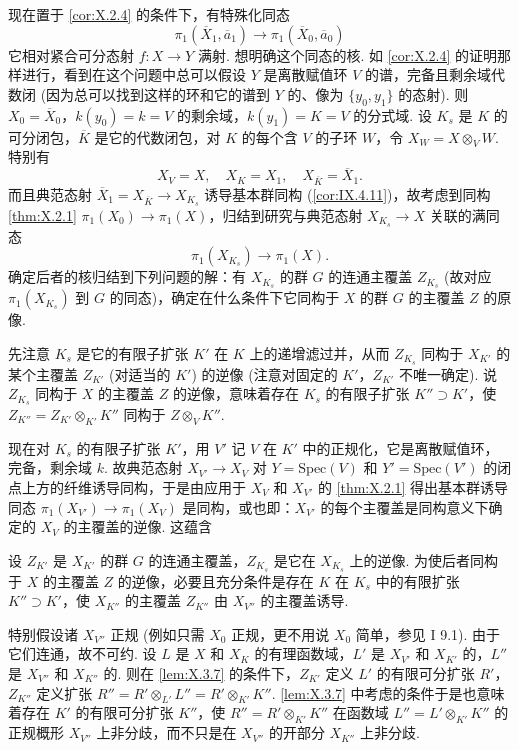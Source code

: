 现在置于 \ref{cor:X.2.4} 的条件下，有特殊化同态
\[
\pi_1(\overline{X}_1, \overline{a}_1) \longrightarrow \pi_1(\overline{X}_0, \overline{a}_0)
\]
它相对紧合可分态射 $f \colon X \to Y$ 满射. 想明确这个同态的核. 如 \ref{cor:X.2.4} 的证明那样进行，看到在这个问题中总可以假设 $Y$ 是离散赋值环 $V$ 的谱，完备且剩余域代数闭 (因为总可以找到这样的环和它的谱到 $Y$ 的、像为 $\{y_0, y_1\}$ 的态射). 则 $X_0 = \overline{X}_0$，$k(y_0) = k = V$ 的剩余域，$k(y_1) = K = V$ 的分式域. 设 $K_s$ 是 $K$ 的可分闭包，$\overline{K}$ 是它的代数闭包，对 $K$ 的每个含 $V$ 的子环 $W$，令 $X_W = X \otimes_V W$. 特别有
\[
X_V = X, \quad X_K = X_1, \quad X_{\overline{K}} = \overline{X}_1.
\]
而且典范态射 $\overline{X}_1 = X_{\overline{K}} \to X_{K_s}$ 诱导基本群同构 (\cref{cor:IX.4.11})，故考虑到同构 \ref{thm:X.2.1} $\pi_1(X_0) \to \pi_1(X)$，归结到研究与典范态射 $X_{K_s} \to X$ 关联的满同态
\[
\pi_1(X_{K_s}) \longrightarrow \pi_1(X).
\]
确定后者的核归结到下列问题的解：有 $X_{K_s}$ 的群 $G$ 的连通主覆盖 $Z_{K_s}$ (故对应 $\pi_1(X_{K_s})$ 到 $G$ 的同态)，确定在什么条件下它同构于 $X$ 的群 $G$ 的主覆盖 $Z$ 的原像.

先注意 $K_s$ 是它的有限子扩张 $K'$ 在 $K$ 上的递增滤过并，从而 $Z_{K_s}$ 同构于 $X_{K'}$ 的某个主覆盖 $Z_{K'}$ (对适当的 $K'$) 的逆像 (注意对固定的 $K'$，$Z_{K'}$ 不唯一确定). 说 $Z_{K_s}$ 同构于 $X$ 的主覆盖 $Z$ 的逆像，意味着存在 $K_s$ 的有限子扩张 $K'' \supset K'$，使 $Z_{K''} = Z_{K'} \otimes_{K'} K''$ 同构于 $Z \otimes_V K''$.

现在对 $K_s$ 的有限子扩张 $K'$，用 $V'$ 记 $V$ 在 $K'$ 中的正规化，它是离散赋值环，完备，剩余域 $k$. 故典范态射 $X_{V'} \to X_V$ 对 $Y = \mathrm{Spec}(V)$ 和 $Y' = \mathrm{Spec}(V')$ 的闭点上方的纤维诱导同构，于是由应用于 $X_V$ 和 $X_{V'}$ 的 \ref{thm:X.2.1} 得出基本群诱导同态 $\pi_1(X_{V'}) \to \pi_1(X_V)$ 是同构，或也即：$X_{V'}$ 的每个主覆盖是同构意义下确定的 $X_V$ 的主覆盖的逆像. 这蕴含

\begin{lemma}\label{lem:X.3.7}
设 $Z_{K'}$ 是 $X_{K'}$ 的群 $G$ 的连通主覆盖，$Z_{K_s}$ 是它在 $X_{K_s}$ 上的逆像. 为使后者同构于 $X$ 的主覆盖 $Z$ 的逆像，必要且充分条件是存在 $K$ 在 $K_s$ 中的有限扩张 $K'' \supset K'$，使 $X_{K''}$ 的主覆盖 $Z_{K''}$ 由 $X_{V''}$ 的主覆盖诱导.
\end{lemma}

特别假设诸 $X_{V''}$ 正规 (例如只需 $X_0$ 正规，更不用说 $X_0$ 简单，参见 I 9.1). 由于它们连通，故不可约. 设 $L$ 是 $X$ 和 $X_K$ 的有理函数域，$L'$ 是 $X_{V'}$ 和 $X_{K'}$ 的，$L''$ 是 $X_{V''}$ 和 $X_{K''}$ 的. 则在 \ref{lem:X.3.7} 的条件下，$Z_{K'}$ 定义 $L'$ 的有限可分扩张 $R'$，$Z_{K''}$ 定义扩张 $R'' = R' \otimes_{L'} L'' = R' \otimes_{K'} K''$. \ref{lem:X.3.7} 中考虑的条件于是也意味着存在 $K'$ 的有限可分扩张 $K''$，使 $R'' = R' \otimes_{K'} K''$ 在函数域 $L'' = L' \otimes_{K'} K''$ 的正规概形 $X_{V''}$ 上非分歧，而不只是在 $X_{V''}$ 的开部分 $X_{K''}$ 上非分歧.

